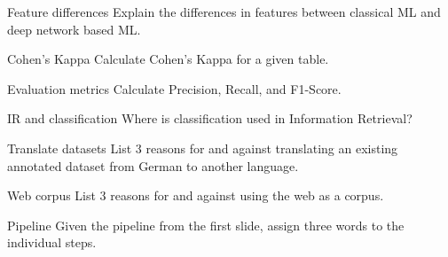 \documentclass{article}
\begin{document}
\begin{exercise}{Feature differences}
  Explain the differences in features between classical ML and deep network based ML.

  \begin{solution}
  \end{solution}
\end{exercise}

\begin{exercise}{Cohen's Kappa}
  Calculate Cohen's Kappa for a given table.

  \begin{solution}
  \end{solution}
\end{exercise}

\begin{exercise}{Evaluation metrics}
  Calculate Precision, Recall, and F1-Score.

  \begin{solution}
  \end{solution}
\end{exercise}

\begin{exercise}{IR and classification}
  Where is classification used in Information Retrieval?

  \begin{solution}
  \end{solution}
\end{exercise}

\begin{exercise}{Translate datasets}
  List 3 reasons for and against translating an existing annotated dataset from German to another language.

  \begin{solution}
  \end{solution}
\end{exercise}

\begin{exercise}{Web corpus}
  List 3 reasons for and against using the web as a corpus.

  \begin{solution}
  \end{solution}
\end{exercise}

\begin{exercise}{Pipeline}
  Given the pipeline from the first slide, assign three words to the individual steps.

  \begin{solution}
  \end{solution}
\end{exercise}
\end{document}
